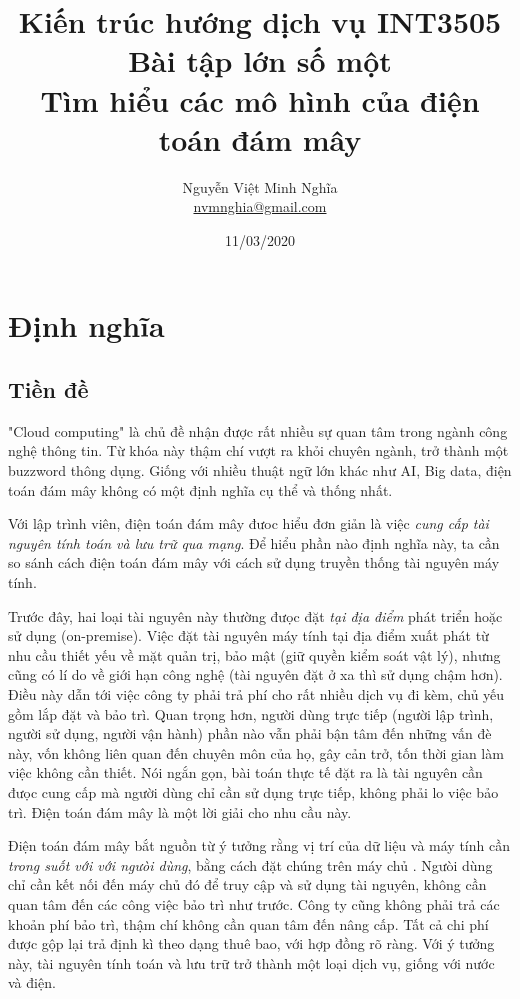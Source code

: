 \documentclass{article}
\author{Nguyễn Việt Minh Nghĩa \\ \href{mailto:nvmnghia@gmail.com}{nvmnghia@gmail.com}}
\date{11/03/2020}
\title{Kiến trúc hướng dịch vụ INT3505 \\ Bài tập lớn số một \\ Tìm hiểu các mô hình của điện toán đám mây}
\begin{document}
\maketitle

\section{Định nghĩa}

\subsection{Tiền đề}

"Cloud computing" là chủ đề nhận được rất nhiều sự quan tâm trong ngành công
nghệ thông tin. Từ khóa này thậm chí vượt ra khỏi chuyên ngành, trở thành một
buzzword thông dụng. Giống với nhiều thuật ngữ lớn khác như AI, Big data, điện
toán đám mây không có một định nghĩa cụ thể và thống nhất.

Với lập trình viên, điện toán đám mây đưoc hiểu đơn giản là việc \emph{cung cấp
tài nguyên tính toán và lưu trữ qua mạng}. Để hiểu phần nào định nghĩa này, ta
cần so sánh cách điện toán đám mây với cách sử dụng truyền thống tài nguyên máy
tính.

Trước đây, hai loại tài nguyên này thường đưọc đặt \emph{tại địa điểm} phát
triển hoặc sử dụng (on-premise). Việc đặt tài nguyên máy tính tại địa điểm xuất
phát từ nhu cầu thiết yếu về mặt quản trị, bảo mật (giữ quyền kiểm soát vật lý),
nhưng cũng có lí do về giới hạn công nghệ (tài nguyên đặt ở xa thì sử dụng chậm
hơn). Điều này dẫn tới việc công ty phải trả phí cho rất nhiều dịch vụ đi kèm,
chủ yếu gồm lắp đặt và bảo trì. Quan trọng hơn, người dùng trực tiếp (người lập
trình, người sử dụng, người vận hành) phần nào vẫn phải bận tâm đến những vấn đè
này, vốn không liên quan đến chuyên môn của họ, gây cản trở, tốn thời gian làm
việc không cần thiết. Nói ngắn gọn, bài toán thực tế đặt ra là tài nguyên cần
đưọc cung cấp mà người dùng chỉ cần sử dụng trực tiếp, không phải lo việc bảo
trì. Điện toán đám mây là một lời giải cho nhu cầu này.

Điện toán đám mây bắt nguồn từ ý tưởng rằng vị trí của dữ liệu và máy tính cần
\emph{trong suốt với với ngưòi dùng}, bằng cách đặt chúng trên máy chủ
\cite{SES2006}. Ngưòi dùng chỉ cần kết nối đến máy chủ đó để truy cập và sử dụng
tài nguyên, không cần quan tâm đến các công việc bảo trì như trước. Công ty cũng
không phải trả các khoản phí bảo trì, thậm chí không cần quan tâm đến nâng cấp.
Tất cả chi phí được gộp lại trả định kì theo dạng thuê bao, với hợp đồng rõ
ràng. Với ý tưởng này, tài nguyên tính toán và lưu trữ trở thành một loại dịch
vụ, giống với nước và điện.
\end{document}
